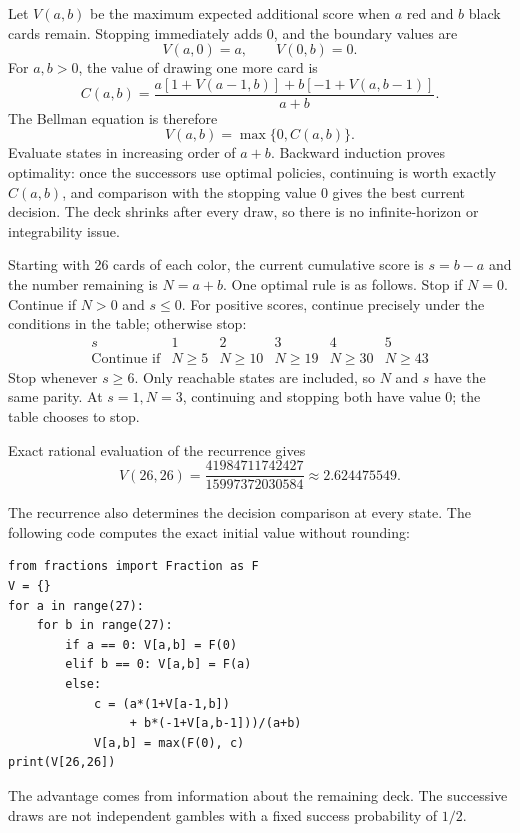 Let $V(a,b)$ be the maximum expected additional score when $a$ red and $b$ black cards remain. Stopping immediately adds 0, and the boundary values are
\[
 V(a,0)=a,\qquad V(0,b)=0.
\]
For $a,b>0$, the value of drawing one more card is
\[
 C(a,b)=\frac{a[1+V(a-1,b)]+b[-1+V(a,b-1)]}{a+b}.
\]
The Bellman equation is therefore
\[
 \boxed{V(a,b)=\max\{0,C(a,b)\}}.
\]
Evaluate states in increasing order of $a+b$. Backward induction proves optimality: once the successors use optimal policies, continuing is worth exactly $C(a,b)$, and comparison with the stopping value 0 gives the best current decision. The deck shrinks after every draw, so there is no infinite-horizon or integrability issue.

Starting with 26 cards of each color, the current cumulative score is $s=b-a$ and the number remaining is $N=a+b$. One optimal rule is as follows. Stop if $N=0$. Continue if $N>0$ and $s\le0$. For positive scores, continue precisely under the conditions in the table; otherwise stop:
\[
 \begin{array}{c|ccccc}
 s&1&2&3&4&5\\\hline
 \text{Continue if}&N\ge5&N\ge10&N\ge19&N\ge30&N\ge43
 \end{array}
\]
Stop whenever $s\ge6$. Only reachable states are included, so $N$ and $s$ have the same parity. At $s=1,N=3$, continuing and stopping both have value 0; the table chooses to stop.

Exact rational evaluation of the recurrence gives
\[
 \boxed{V(26,26)=\frac{41984711742427}{15997372030584}
       \approx2.624475549}.
\]
\par\smallskip\noindent\begin{minipage}{\linewidth}
The recurrence also determines the decision comparison at every state. The following code computes the exact initial value without rounding:
\begin{verbatim}
from fractions import Fraction as F
V = {}
for a in range(27):
    for b in range(27):
        if a == 0: V[a,b] = F(0)
        elif b == 0: V[a,b] = F(a)
        else:
            c = (a*(1+V[a-1,b])
                 + b*(-1+V[a,b-1]))/(a+b)
            V[a,b] = max(F(0), c)
print(V[26,26])
\end{verbatim}
\end{minipage}\par\smallskip
The advantage comes from information about the remaining deck. The successive draws are not independent gambles with a fixed success probability of $1/2$.
